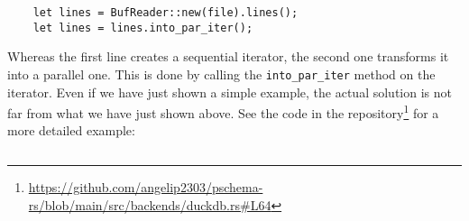 \begin{verbatim}
    let lines = BufReader::new(file).lines();
    let lines = lines.into_par_iter();
\end{verbatim}

Whereas the first line creates a sequential iterator, the second one transforms it into a parallel one. This is done by calling the \texttt{into\_par\_iter} method on the iterator. Even if we have just shown a simple example, the actual solution is not far from what we have just shown above. See the code in the repository\footnote{\url{https://github.com/angelip2303/pschema-rs/blob/main/src/backends/duckdb.rs\#L64}} for a more detailed example:

\begin{code}
    \inputminted{rust}{code/listings/11-2_duckdb.rs}
\end{code}
